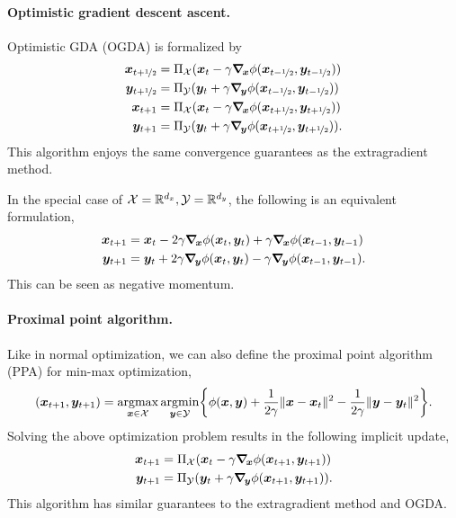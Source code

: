 \paragraph{Optimistic gradient descent ascent.}

Optimistic GDA (OGDA) is formalized by
\begin{align*}
    \vec{x}_{t+\nicefrac{1}{2}} & = \Pi_{\mathcal{X}}(\vec{x}_t - \gamma \grad{\phi(\vec{x}_{t-\nicefrac{1}{2}}, \vec{y}_{t-\nicefrac{1}{2}})}{\vec{x}})  \\
    \vec{y}_{t+\nicefrac{1}{2}} & = \Pi_{\mathcal{Y}}(\vec{y}_t + \gamma \grad{\phi(\vec{x}_{t-\nicefrac{1}{2}}, \vec{y}_{t-\nicefrac{1}{2}})}{\vec{y}})  \\
    \vec{x}_{t+1}               & = \Pi_{\mathcal{X}}(\vec{x}_t - \gamma \grad{\phi(\vec{x}_{t+\nicefrac{1}{2}}, \vec{y}_{t+\nicefrac{1}{2}})}{\vec{x}})  \\
    \vec{y}_{t+1}               & = \Pi_{\mathcal{Y}}(\vec{y}_t + \gamma \grad{\phi(\vec{x}_{t+\nicefrac{1}{2}}, \vec{y}_{t+\nicefrac{1}{2}})}{\vec{y}}).
\end{align*}
This algorithm enjoys the same convergence guarantees as the extragradient method.

In the special case of $\mathcal{X} = \R^{d_x}, \mathcal{Y} = \R^{d_y}$, the following is an
equivalent formulation,
\begin{align*}
    \vec{x}_{t+1} & = \vec{x}_t - 2 \gamma \grad{\phi(\vec{x}_t, \vec{y}_t)}{\vec{x}} + \gamma \grad{\phi(\vec{x}_{t-1}, \vec{y}_{t-1})}{\vec{x}}  \\
    \vec{y}_{t+1} & = \vec{y}_t + 2 \gamma \grad{\phi(\vec{x}_t, \vec{y}_t)}{\vec{y}} - \gamma \grad{\phi(\vec{x}_{t-1}, \vec{y}_{t-1})}{\vec{y}}.
\end{align*}
This can be seen as negative momentum.

\paragraph{Proximal point algorithm.}

Like in normal optimization, we can also define the proximal point algorithm (PPA) for min-max
optimization, \[
    (\vec{x}_{t+1}, \vec{y}_{t+1}) = \argmax_{\vec{x} \in \mathcal{X}} \argmin_{\vec{y} \in \mathcal{Y}} \lft\{ \phi(\vec{x}, \vec{y}) + \frac{1}{2 \gamma} \| \vec{x} - \vec{x}_t \|^2 - \frac{1}{2 \gamma} \| \vec{y} - \vec{y}_t \|^2 \rgt\}.
\]
Solving the above optimization problem results in the following implicit update,
\begin{align*}
    \vec{x}_{t+1} & = \Pi_{\mathcal{X}}(\vec{x}_t - \gamma \grad{\phi(\vec{x}_{t+1}, \vec{y}_{t+1})}{\vec{x}})  \\
    \vec{y}_{t+1} & = \Pi_{\mathcal{Y}}(\vec{y}_t + \gamma \grad{\phi(\vec{x}_{t+1}, \vec{y}_{t+1})}{\vec{y}}).
\end{align*}
This algorithm has similar guarantees to the extragradient method and OGDA.

